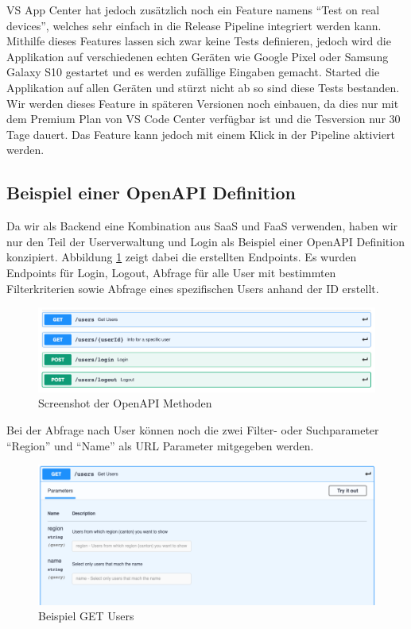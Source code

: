 VS App Center hat jedoch zusätzlich noch ein Feature namens ``Test on real devices'', welches sehr einfach in die Release Pipeline integriert werden kann. Mithilfe dieses Features lassen sich zwar keine Tests definieren, jedoch wird die Applikation auf verschiedenen echten Geräten wie Google Pixel oder Samsung Galaxy S10 gestartet und es werden zufällige Eingaben gemacht. Started die Applikation auf allen Geräten und stürzt nicht ab so sind diese Tests bestanden. Wir werden dieses Feature in späteren Versionen noch einbauen, da dies nur mit dem Premium Plan von VS Code Center verfügbar ist und die Tesversion nur 30 Tage dauert. Das Feature kann jedoch mit einem Klick in der Pipeline aktiviert werden.

\subsection{Beispiel einer OpenAPI Definition}

Da wir als Backend eine Kombination aus SaaS und FaaS verwenden, haben wir nur den Teil der Userverwaltung und Login als Beispiel einer OpenAPI Definition konzipiert.
Abbildung \ref{fig:openapi_methods} zeigt dabei die erstellten Endpoints. Es wurden Endpoints für Login, Logout, Abfrage für alle User mit bestimmten Filterkriterien sowie Abfrage 
eines spezifischen Users anhand der ID erstellt.

\begin{figure}[H]
    \centering
    \includegraphics[width=\textwidth]{images/swagger_overview.png}
    \caption{Screenshot der OpenAPI Methoden}
    \label{fig:openapi_methods}
\end{figure}

Bei der Abfrage nach User können noch die zwei Filter- oder Suchparameter ``Region'' und ``Name'' als URL Parameter mitgegeben werden.

\begin{figure}[H]
    \centering
    \includegraphics[width=\textwidth]{images/swagger_get_users.png}
    \caption{Beispiel GET Users}
    \label{fig:openapi_get_users}
\end{figure}

